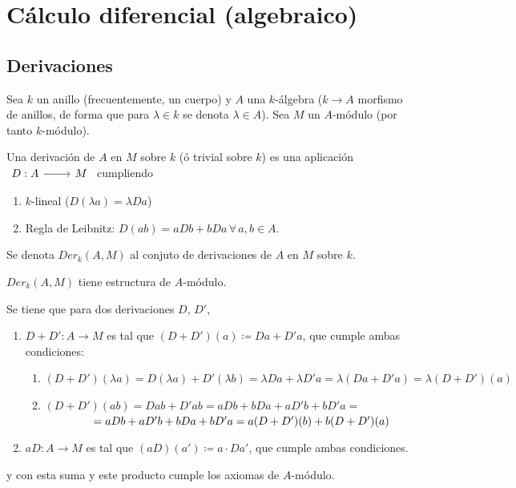 \chapter{C\'alculo diferencial (algebraico)}
\section{Derivaciones}
Sea $k$ un anillo (frecuentemente, un cuerpo) y $A$ una $k$-\'algebra ($k \to A$ morfismo de anillos, de forma que para $\lambda \in k$ se denota $\lambda \in A$). Sea $M$ un $A$-m\'odulo (por tanto $k$-m\'odulo).
\begin{defi}
    Una derivaci\'on de $A$ en $M$ sobre $k$ (\'o trivial sobre $k$) es una aplicaci\'on
    $\bt D: A \rar & M  \et$ cumpliendo \vspace{-3mm}
    \begin{enumerate}
        \item $k$-lineal ($D(\lambda a) = \lambda Da$)
        \item Regla de Leibnitz: $D(ab) = aDb + bDa \, \forall \, a,b \in A$.
    \end{enumerate}
    Se denota $Der_k(A,M)$ al conjuto de derivaciones de $A$ en $M$ sobre $k$. 
\end{defi}
\begin{prop}
    $Der_k(A,M)$ tiene estructura de $A$-m\'odulo.
\end{prop}
\begin{dem}
    Se tiene que para dos derivaciones $D, \, D'$, 
    \begin{enumerate}
        \item $D+ D': A\longrightarrow M$ es tal que $(D+D')(a) \coloneq Da+D'a$, que cumple ambas condiciones:
        \begin{enumerate}
            \item $(D+D')(\lambda a)= D(\lambda a) + D'(\lambda b) = \lambda Da+\lambda D'a=\lambda (Da+D'a)=\lambda (D+D')(a)$
            \item $(D+D')(ab) = Dab + D'ab = aDb + bDa + aD'b + bD'a = $ \\ 
            $ \hspace{15mm}   = aDb+aD'b+bDa+bD'a = a(D+D')(b) + b (D+D')(a)$
        \end{enumerate}
        \item $aD : A \longrightarrow M$ es tal que $(aD) (a') \coloneq a \cdot Da'$, que cumple ambas condiciones.
    \end{enumerate}
    y con esta suma y este producto cumple los axiomas de $A$-m\'odulo. 
\end{dem}
